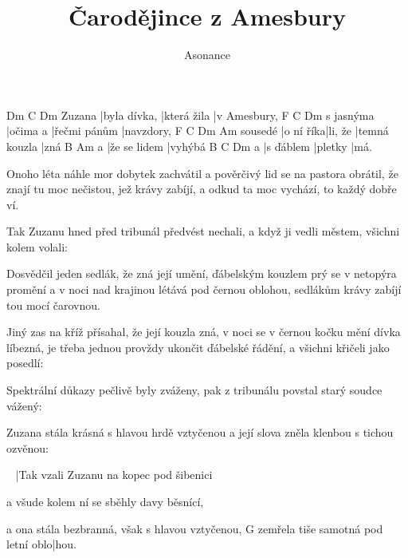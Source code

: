 \documentclass{song}
\title{Čarodějince z Amesbury}
\author{Asonance}
\begin{document}
\strophe
       Dm           C           Dm
Zuzana |byla dívka, |která žila |v Amesbury,
          F        C            Dm
s jasnýma |očima a |řečmi pánům |navzdory,
        F         C       Dm            Am
sousedé |o ní říka|li, že |temná kouzla |zná
  B            Am
a |že se lidem |vyhýbá
  B         C       Dm
a |s ďáblem |pletky |má.
\endstrophe

\strophe*
Onoho léta náhle mor dobytek zachvátil
a pověrčivý lid se na pastora obrátil,
že znají tu moc nečistou, jež krávy zabíjí,
a odkud ta moc vychází, to každý dobře ví.
\endstrophe

\strophe*
Tak Zuzanu hned před tribunál předvést nechali,
a když ji vedli městem, všichni kolem volali:
\endstrophe

\strophe*
Dosvědčil jeden sedlák, že zná její umění,
ďábelským kouzlem prý se v netopýra promění
a v noci nad krajinou létává pod černou oblohou,
sedlákům krávy zabíjí tou mocí čarovnou.
\endstrophe

\strophe*
Jiný zas na kříž přísahal, že její kouzla zná,
v noci se v černou kočku mění dívka líbezná,
je třeba jednou provždy ukončit ďábelské řádění,
a všichni křičeli jako posedlí: 
\endstrophe

\strophe*
Spektrální důkazy pečlivě byly zváženy,
pak z tribunálu povstal starý soudce vážený:
\endstrophe

\strophe*
Zuzana stála krásná s hlavou hrdě vztyčenou
a její slova zněla klenbou s tichou ozvěnou:
\endstrophe

\strophe
~
|Tak vzali Zuzanu na kopec pod šibenici

a všude kolem ní se sběhly davy běsnící,

a ona stála bezbranná, však s hlavou vztyčenou,
                                   G
zemřela tiše samotná pod letní oblo|hou.
\endstrophe
\end{document}
